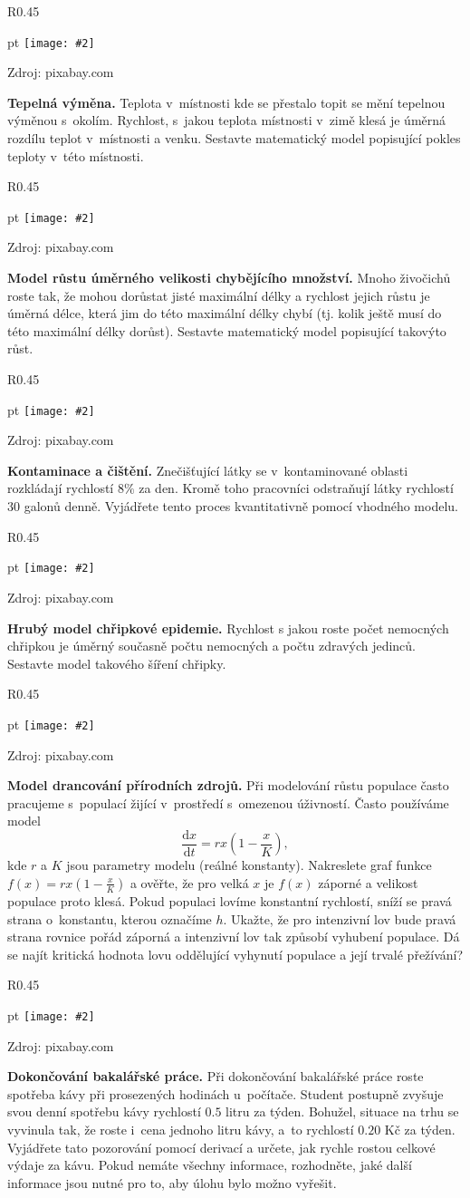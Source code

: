 \documentclass{article}
\newcommand\obrazek[2][pixabay.com]{
  \clearpage
\begin{wrapfigure}{R}{0.45\linewidth}
  \begin{minipage}{1.0\linewidth}\parskip 0 pt
  \texttt{[image: \#2]}

  \vspace*{-10pt}
  \null\hfill{\color{gray}\footnotesize Zdroj: #1}
    
  \end{minipage}
\end{wrapfigure}
}
\let\oldtextbf\textbf
\def\textbf#1{%
  \oldtextbf{\color{red} #1}}
\begin{document}
\obrazek{room.jpg}
\textbf{Tepelná výměna.}  Teplota v místnosti kde se přestalo topit se mění
tepelnou výměnou s okolím. Rychlost, s jakou teplota místnosti v zimě klesá je
úměrná rozdílu teplot v místnosti a venku. Sestavte matematický model
popisující pokles teploty v této místnosti.


\obrazek{mladata.jpg}
\textbf{Model růstu úměrného velikosti chybějícího množství.}  Mnoho
živočichů roste tak, že mohou dorůstat jisté maximální délky a
rychlost jejich růstu je úměrná délce, která jim do této maximální
délky chybí (tj. kolik ještě musí do této maximální délky
dorůst). Sestavte matematický model popisující takovýto růst.


\obrazek{kontaminace.jpg}
\textbf{Kontaminace a čištění.}
Znečišťující látky se v kontaminované oblasti rozkládají rychlostí
$8\%$ za den. Kromě toho pracovníci odstraňují látky rychlostí $30$
galonů denně. Vyjádřete tento proces kvantitativně pomocí vhodného
modelu.

\obrazek{nemoc.jpg} \textbf{Hrubý model chřipkové epidemie.}  Rychlost
s jakou roste počet nemocných chřipkou je úměrný současně počtu
nemocných a počtu zdravých jedinců. Sestavte model takového šíření
chřipky. 


\obrazek{lov.jpg}
\textbf{Model drancování přírodních zdrojů.}
Při modelování růstu populace často pracujeme s populací žijící v prostředí s omezenou úživností. Často používáme model
$$\frac{\mathrm d x}{\mathrm dt}=rx\left(1-\frac xK\right),$$
kde $r$ a $K$ jsou parametry modelu (reálné konstanty).  Nakreslete
graf funkce $f(x)=rx\left(1-\frac xK\right)$ a ověřte, že pro velká
$x$ je $f(x)$ záporné a velikost populace proto klesá. Pokud populaci
lovíme konstantní rychlostí, sníží se pravá strana o konstantu, kterou
označíme $h$. Ukažte, že pro intenzivní lov bude pravá strana rovnice
pořád záporná a intenzivní lov tak způsobí vyhubení populace. Dá se
najít kritická hodnota lovu oddělující vyhynutí populace a její
trvalé přežívání?

\obrazek{kafe.jpg}
\textbf{Dokončování bakalářské práce.} Při dokončování bakalářské
práce roste spotřeba kávy při prosezených hodinách u počítače. Student
postupně zvyšuje svou denní spotřebu kávy rychlostí $0.5$ litru za
týden. Bohužel, situace na trhu se vyvinula tak, že roste i cena
jednoho litru kávy, a to rychlostí $0.20$ Kč za týden. Vyjádřete tato
pozorování pomocí derivací a určete, jak rychle rostou celkové výdaje
za kávu. Pokud nemáte všechny informace, rozhodněte, jaké další
informace jsou nutné pro to, aby úlohu bylo možno vyřešit.
\end{document}
